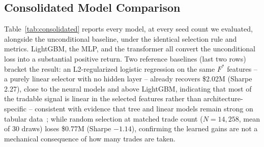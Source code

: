 \documentclass[sigconf,review]{acmart}
\begin{document}
\subsection{Consolidated Model Comparison}
\label{sec:seedcount}
Table~\ref{tab:consolidated} reports every model, at every seed count we evaluated, alongside the unconditional baseline, under the identical selection rule and metrics. LightGBM, the MLP, and the transformer all convert the unconditional loss into a substantial positive return. Two reference baselines (last two rows) bracket the result: an L2-regularized logistic regression on the same $F^{\ast}$ features -- a purely linear selector with no hidden layer -- already recovers \$2.02M (Sharpe 2.27), close to the neural models and above LightGBM, indicating that most of the tradable signal is linear in the selected features rather than architecture-specific -- consistent with evidence that tree and linear models remain strong on tabular data~\cite{grinsztajn2022why,shwartzziv2022tabular,gorishniy2021revisiting}; while random selection at matched trade count ($N{=}14{,}258$, mean of 30 draws) loses \$0.77M (Sharpe $-1.14$), confirming the learned gains are not a mechanical consequence of how many trades are taken.
\end{document}
